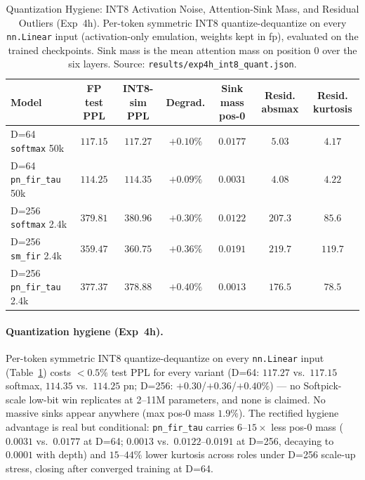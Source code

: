 \documentclass[11pt,a4paper]{article}
\begin{document}
\begin{table}[ht!]
\centering
\caption{Quantization Hygiene: INT8 Activation Noise, Attention-Sink Mass, and Residual Outliers (Exp~4h). Per-token symmetric INT8 quantize-dequantize on every \texttt{nn.Linear} input (activation-only emulation, weights kept in fp), evaluated on the trained checkpoints. Sink mass is the mean attention mass on position 0 over the six layers. Source: \texttt{results/exp4h\_int8\_quant.json}.}
\label{tab:int8-hygiene}
\scriptsize
\setlength{\tabcolsep}{2.2pt}
\begin{tabular}{lcccccc}
\toprule
Model & FP test PPL & INT8-sim PPL & Degrad. & Sink mass pos-0 & Resid. absmax & Resid. kurtosis \\
\midrule
D=64 \texttt{softmax} 50k & $117.15$ & $117.27$ & $+0.10\%$ & $0.0177$ & $5.03$ & $4.17$ \\
D=64 \texttt{pn\_fir\_tau} 50k & $114.25$ & $114.35$ & $+0.09\%$ & $0.0031$ & $4.08$ & $4.22$ \\
D=256 \texttt{softmax} 2.4k & $379.81$ & $380.96$ & $+0.30\%$ & $0.0122$ & $207.3$ & $85.6$ \\
D=256 \texttt{sm\_fir} 2.4k & $359.47$ & $360.75$ & $+0.36\%$ & $0.0191$ & $219.7$ & $119.7$ \\
D=256 \texttt{pn\_fir\_tau} 2.4k & $377.37$ & $378.88$ & $+0.40\%$ & $0.0013$ & $176.5$ & $78.5$ \\
\bottomrule
\end{tabular}
\end{table}

\paragraph*{Quantization hygiene (Exp~4h).} Per-token symmetric INT8 quantize-dequantize on every \texttt{nn.Linear} input (Table~\ref{tab:int8-hygiene}) costs $<0.5\%$ test PPL for every variant (D=64: $117.27$ vs.\ $117.15$ softmax, $114.35$ vs.\ $114.25$ pn; D=256: $+0.30$/$+0.36$/$+0.40\%$) --- no Softpick-scale low-bit win replicates at 2--11M parameters, and none is claimed. No massive sinks appear anywhere (max pos-0 mass $1.9\%$). The rectified hygiene advantage is real but conditional: \texttt{pn\_fir\_tau} carries $6$--$15\times$ less pos-0 mass ($0.0031$ vs.\ $0.0177$ at D=64; $0.0013$ vs.\ $0.0122$--$0.0191$ at D=256, decaying to $0.0001$ with depth) and $15$--$44\%$ lower kurtosis across roles under D=256 scale-up stress, closing after converged training at D=64.
\end{document}
